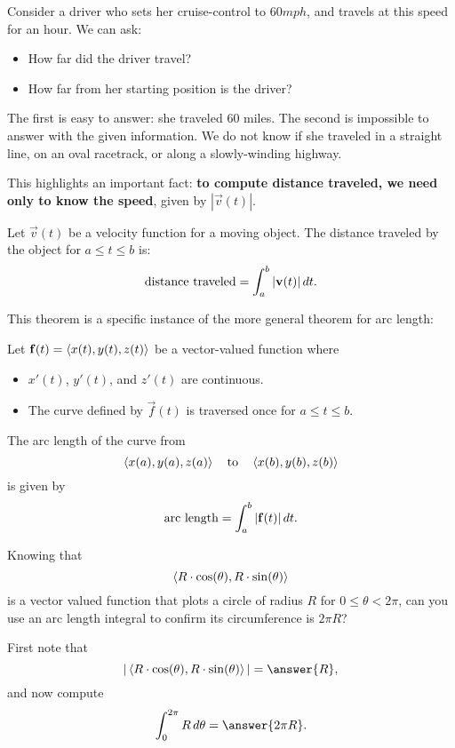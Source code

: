 \documentclass{ximera}
\begin{document}
Consider a driver who sets her cruise-control to $60\unit{mph}$, and
travels at this speed for an hour. We can ask:
\begin{itemize}
\item How far did the driver travel?
\item How far from her starting position is the driver?
\end{itemize} 
The first is easy to answer: she traveled $60$ miles. The second is
impossible to answer with the given information. We do not know if she
traveled in a straight line, on an oval racetrack, or along a
slowly-winding highway.

This highlights an important fact: \textbf{to compute distance traveled, we
need only to know the speed}, given by $|\vec{v}(t)|$.

\begin{theorem}
Let $\vec{v}(t)$ be a velocity function for a moving object. The
distance traveled by the object for $a\le t\le b$ is:
\[
\text{distance traveled} = \int_a^b |\mathbf{v}(t)|\mathop{}\!d t.
\]
\end{theorem}

This theorem is a specific instance of the more general theorem for
arc length:
\begin{theorem}
  Let $\mathbf{f}(t) = \left\langle x(t),y(t),z(t)\right\rangle$ be a vector-valued function where
  \begin{itemize}
  \item $x'(t)$, $y'(t)$, and $z'(t)$ are continuous.
  \item The curve defined by $\vec{f}(t)$ is traversed once for $a\le
    t\le b$.
  \end{itemize}
  The arc length of the curve from
  \[
  \left\langle x(a),y(a),z(a)\right\rangle\quad\text{to}\quad\left\langle x(b),y(b),z(b)\right\rangle
  \]
  is given by
  \[
  \text{arc length} = \int_a^b |\mathbf{f}(t)|\mathop{}\!d t.
  \]
\end{theorem}


\begin{question}
  Knowing that
  \[
  \left\langle R\cdot \cos(\theta), R \cdot \sin(\theta)\right\rangle
  \]
  is a vector valued function that plots a circle of radius $R$ for
  $0\le \theta < 2\pi$, can you use an arc length integral to confirm
  its circumference is $2\pi R$?
  \begin{prompt}
    First note that
    \[
    |\vector{R\cdot \cos(\theta), R \cdot \sin(\theta)}| = \answer{R},
    \]
    and now compute
    \[
    \int_0^{2\pi} R \d \theta = \answer{2\pi R}.
    \]
  \end{prompt}
\end{question}
\end{document}
